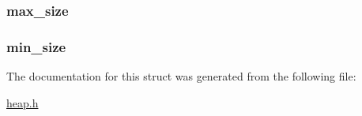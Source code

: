 \subsubsection[{max\+\_\+size}]{ max\+\_\+size}\label{structheap_aff98f60fdff673e586a88d147da4798c}
\hypertarget{structheap_af515ec763221e45adce632886c4cb888}{}
\subsubsection[{min\+\_\+size}]{ min\+\_\+size}\label{structheap_af515ec763221e45adce632886c4cb888}


The documentation for this struct was generated from the following file\+:\begin{DoxyCompactItemize}
\item 
\hyperlink{heap_8h}{heap.\+h}\end{DoxyCompactItemize}
